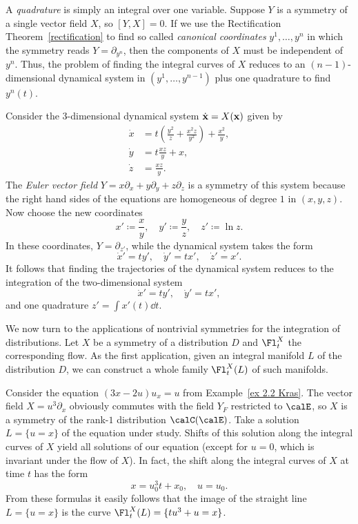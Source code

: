 A \emph{quadrature} is simply an integral over one variable. Suppose $Y$ is a symmetry of a single vector field $X$, so $[Y,X]=0$. If we use the Rectification Theorem~\ref{rectification} to find so called \emph{canonical coordinates}  $y^1,\ldots,y^n$ in which the symmetry reads $Y=\partial_{y^n}$, then the components of $X$ must be independent of $y^n$. Thus, the problem of finding the integral curves of $X$ reduces to an $(n-1)$-dimensional dynamical system in $(y^1,\ldots,y^{n-1})$ plus one quadrature to find $y^n(t)$.


\begin{example}
    Consider the $3$-dimensional dynamical system $\dot{\bf{x}}=X(\bf{x})$ given by
    \begin{align}
        \dot x&=t\left(\frac{y^2}{z}+\frac{x^2z}{y^2}\right)+\frac{x^2}{y},\\
        \dot y&=t\frac{xz}{y}+x,\\
        \dot z&=\frac{xz}{y}.
    \end{align}
    The \emph{Euler vector field} $Y=x\partial_x+y\partial_y+z\partial_z$ is a symmetry of this system because the right hand sides of the equations are homogeneous of degree $1$ in $(x,y,z)$. Now choose the new coordinates 
    \[x'\coloneqq \frac{x}{y},\quad y'\coloneqq \frac{y}{z},\quad z'\coloneqq \ln z.\]
    In these coordinates, $Y=\partial_{z'}$, while the dynamical system takes the form 
    \[\dot x'=ty',\quad \dot y'=tx',\quad \dot z'=x'.\]
    It follows that finding the trajectories of the dynamical system reduces to the integration of the two-dimensional system 
    \[\dot x'=t y',\quad \dot y'=tx',\]
    and one quadrature $z'=\int x'(t)\dd t$.
\end{example}

We now turn to the applications of nontrivial symmetries for the integration of distributions. Let $X$ be a symmetry of a distribution $D$ and $\Fl^X_t$ the corresponding flow. As the first application, given an integral manifold $L$ of the distribution $D$, we can construct a whole family $\Fl_t^X(L)$ of such manifolds.

\begin{example}\label{ex 4.4 Kras}
    Consider the equation $(3x-2u)u_x=u$ from Example~\ref{ex 2.2 Kras}. The vector field $X=u^3\partial_x$ obviously commutes with the field $Y_F$ restricted to $\calE$, so $X$ is a symmetry of the rank-$1$ distribution $\calC(\calE)$. Take a solution $L=\{u=x\}$ of the equation under study. Shifts of this solution along the integral curves of $X$ yield all solutions of our equation (except for $u=0$, which is invariant under the flow of $X$). In fact, the shift along the integral curves of $X$ at time $t$ has the form 
    \[x=u_0^3t+x_0,\quad u=u_0.\]
    From these formulas it easily follows that the image of the straight line $L=\{u=x\}$ is the curve $\Fl^X_t(L)=\{tu^3+u=x\}$.
\end{example}

